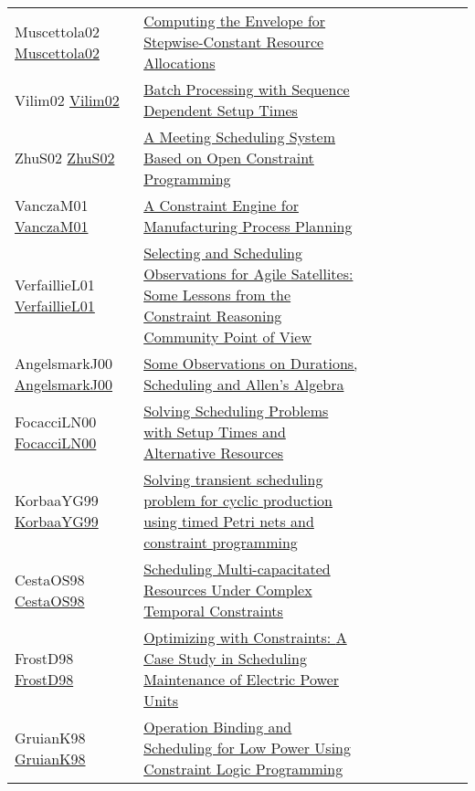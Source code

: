 {\begin{longtable}{p{3cm}p{7cm}lllllll}
Muscettola02 \href{https://doi.org/10.1007/3-540-46135-3\_10}{Muscettola02} &  \href{papers/Muscettola02.pdf}{Computing the Envelope for Stepwise-Constant Resource Allocations} &  &  &  &  &  &  & \\
Vilim02 \href{https://doi.org/10.1007/3-540-46135-3\_62}{Vilim02} &  \href{papers/Vilim02.pdf}{Batch Processing with Sequence Dependent Setup Times} &  &  &  &  &  &  & \\
ZhuS02 \href{https://doi.org/10.1007/3-540-47961-9\_69}{ZhuS02} &  \href{papers/ZhuS02.pdf}{A Meeting Scheduling System Based on Open Constraint Programming} &  &  &  &  &  &  & \\
VanczaM01 \href{https://doi.org/10.1007/3-540-45578-7\_60}{VanczaM01} &  \href{papers/VanczaM01.pdf}{A Constraint Engine for Manufacturing Process Planning} &  &  &  &  &  &  & \\
VerfaillieL01 \href{https://doi.org/10.1007/3-540-45578-7\_55}{VerfaillieL01} &  \href{papers/VerfaillieL01.pdf}{Selecting and Scheduling Observations for Agile Satellites: Some Lessons from the Constraint Reasoning Community Point of View} &  &  &  &  &  &  & \\
AngelsmarkJ00 \href{https://doi.org/10.1007/3-540-45349-0\_35}{AngelsmarkJ00} &  \href{papers/AngelsmarkJ00.pdf}{Some Observations on Durations, Scheduling and Allen's Algebra} &  &  &  &  &  &  & \\
FocacciLN00 \href{http://www.aaai.org/Library/AIPS/2000/aips00-010.php}{FocacciLN00} &  \href{papers/FocacciLN00.pdf}{Solving Scheduling Problems with Setup Times and Alternative Resources} &  &  &  &  &  &  & \\
KorbaaYG99 \href{https://doi.org/10.23919/ECC.1999.7099947}{KorbaaYG99} &  \href{papers/KorbaaYG99.pdf}{Solving transient scheduling problem for cyclic production using timed Petri nets and constraint programming} &  &  &  &  &  &  & \\
CestaOS98 \href{https://doi.org/10.1007/3-540-49481-2\_36}{CestaOS98} &  \href{papers/CestaOS98.pdf}{Scheduling Multi-capacitated Resources Under Complex Temporal Constraints} &  &  &  &  &  &  & \\
FrostD98 \href{https://doi.org/10.1007/3-540-49481-2\_40}{FrostD98} &  \href{papers/FrostD98.pdf}{Optimizing with Constraints: {A} Case Study in Scheduling Maintenance of Electric Power Units} &  &  &  &  &  &  & \\
GruianK98 \href{https://doi.org/10.1109/EURMIC.1998.711781}{GruianK98} &  \href{papers/GruianK98.pdf}{Operation Binding and Scheduling for Low Power Using Constraint Logic Programming} &  &  &  &  &  &  & \\

\end{longtable}}

